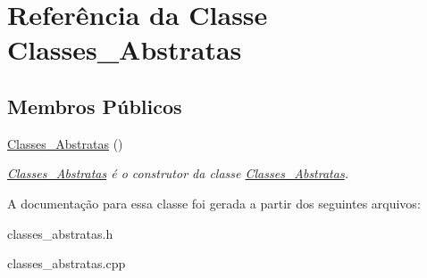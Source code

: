 \hypertarget{class_classes___abstratas}{}\section{Referência da Classe Classes\+\_\+\+Abstratas}
\label{class_classes___abstratas}
\subsection*{Membros Públicos}
\begin{DoxyCompactItemize}
\item 
\mbox{\label{class_classes___abstratas_a5d4807c842f739f07a61e8000dda0f48}} 
\mbox{\hyperlink{class_classes___abstratas_a5d4807c842f739f07a61e8000dda0f48}{Classes\+\_\+\+Abstratas}} ()
\begin{DoxyCompactList}\small\item\em \mbox{\hyperlink{class_classes___abstratas}{Classes\+\_\+\+Abstratas}} é o construtor da classe \mbox{\hyperlink{class_classes___abstratas}{Classes\+\_\+\+Abstratas}}. \end{DoxyCompactList}\end{DoxyCompactItemize}


A documentação para essa classe foi gerada a partir dos seguintes arquivos\+:\begin{DoxyCompactItemize}
\item 
classes\+\_\+abstratas.\+h\item 
classes\+\_\+abstratas.\+cpp\end{DoxyCompactItemize}
